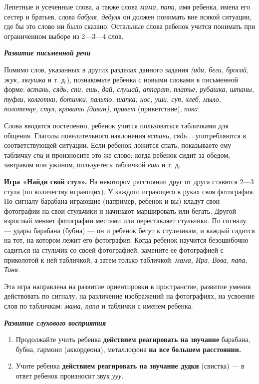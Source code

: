\documentclass{book}
\renewcommand{\emph}[1]{\textit{#1}}
\begin{document}
Лепетные и усеченные слова, а также слова \emph{мама, папа,} имя
ребенка, имена его сестер и братьев, слова \emph{бабуля, дедуля} он
должен понимать вне всякой ситуации, где бы это слово ни было сказано.
Остальные слова ребенок учится понимать при ограниченном выборе из
2---3---4 слов.

\emph{\textbf{Развитие письменной речи}}

Помимо слов, указанных в других разделах данного задания \emph{(иди,
беги, бросай, жук, лягушка} и т. д.), познакомьте ребенка с новыми
словами в письменной форме: \emph{встань, сядь, спи, ешь, дай, слушай,
аппарат, платье, рубашка, штаны, туфли, колготки, ботинки, пальто,
шапка, нос, уши, суп, хлеб, мыло, полотенце, стул, кровать (диван),
привет} (приветствие), \emph{пока.}

Слова вводятся постепенно, ребенок учится пользоваться табличками для
общения. Глаголы повелительного наклонения \emph{встань, сядь...}
употребляются в соответствующей ситуации. Если ребенок ложится спать,
показываете ему табличку \emph{спи} и произносите это же слово; когда
ребенок сидит за обедом, завтраком или ужином, пользуетесь табличкой
\emph{ешь} и т. д.

\textbf{Игра «Найди свой стул».} На некотором расстоянии друг от друга
ставятся 2---3 стула (по количеству играющих). У каждого играющего в
руках своя фотография. По сигналу барабана играющие (например, ребенок и
вы) кладут свои фотографии на свои стульчики и начинают маршировать или
бегать. Другой взрослый меняет фотографии местами или переставляет
стульчики. По сигналу --- удары барабана (бубна) --- он и ребенок бегут
к стульчикам, и каждый садится на тот, на котором лежит его фотография.
Когда ребенок научится безошибочно садиться на стульчик со своей
фотографией, замените ее фотографией с приколотой к ней табличкой, а
затем только табличкой: \emph{мама, Ира, Вова, папа, Таня.}

Эта игра направлена на развитие ориентировки в пространстве, развитие
умения действовать по сигналу, на различение изображений на фотографиях,
на усвоение слов по табличкам: \emph{мама, папа} и таблички с именем
ребенка.

\emph{\textbf{Развитие слухового восприятия}}


\begin{enumerate}
\def\labelenumi{\arabic{enumi}.}
\item
  
  Продолжайте учить ребенка \textbf{действием реагировать на звучание}
  барабана, бубна, гармони (аккордеона), металлофона \textbf{на все
  большем расстоянии.}
  
\item
  
  Учите ребенка \textbf{действием реагировать на звучание дудки}
  (свистка) --- в ответ ребенок произносит звук \emph{ууу.}
  
\end{enumerate}
\end{document}
